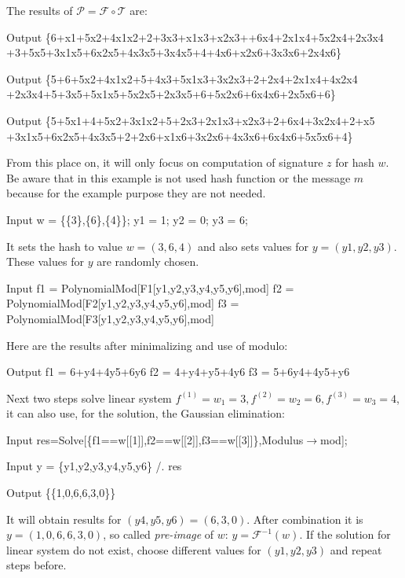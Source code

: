 \documentclass[thesis=M,english]{FITthesis}[2019/12/23]
\begin{document}
\noindent
The results of $\mathcal{P} = \mathcal{F} \circ \mathcal{T}$ are:
\begin{mmaCell}[addtoindex=3,leftmargin=1em]{Output}
\{6+x1+5x2+4x1x2+2+3x3+x1x3+x2x3++6x4+2x1x4+5x2x4+2x3x4
+3+5x5+3x1x5+6x2x5+4x3x5+3x4x5+4+4x6+x2x6+3x3x6+2x4x6\}
\end{mmaCell}
\begin{mmaCell}[leftmargin=1em]{Output}
\{5+6+5x2+4x1x2+5+4x3+5x1x3+3x2x3+2+2x4+2x1x4+4x2x4
+2x3x4+5+3x5+5x1x5+5x2x5+2x3x5+6+5x2x6+6x4x6+2x5x6+6\}
\end{mmaCell}
\begin{mmaCell}[leftmargin=1em]{Output}
\{5+5x1+4+5x2+3x1x2+5+2x3+2x1x3+x2x3+2+6x4+3x2x4+2+x5
+3x1x5+6x2x5+4x3x5+2+2x6+x1x6+3x2x6+4x3x6+6x4x6+5x5x6+4\}
\end{mmaCell}
From this place on, it will only focus on computation of signature $z$ for hash $w$. Be aware that in this example is not used hash function or the message $m$ because for the example purpose they are not needed.
\begin{mmaCell}[moredefined={w, y1, y2, y3}]{Input}
  w  = \{\{3\},\{6\},\{4\}\};
  y1 = 1;
  y2 = 0;
  y3 = 6;
\end{mmaCell}
It sets the hash to value $w = (3,6,4)$ and also sets values for $y = (y1,y2,y3)$. These values for $y$ are randomly chosen.
\begin{mmaCell}[addtoindex=3,moredefined={f1, F1, y1, y2, y3, mod, f2, F2, f3, F3}]{Input}
  f1 = PolynomialMod[F1[y1,y2,y3,y4,y5,y6],mod]
  f2 = PolynomialMod[F2[y1,y2,y3,y4,y5,y6],mod]
  f3 = PolynomialMod[F3[y1,y2,y3,y4,y5,y6],mod]
\end{mmaCell}
Here are the results after minimalizing and use of modulo:
\begin{mmaCell}{Output}
  f1 = 6+y4+4y5+6y6
  f2 = 4+y4+y5+4y6
  f3 = 5+6y4+4y5+y6
\end{mmaCell}
Next two steps solve linear system $f^{(1)} = w_1 = 3, f^{(2)} = w_2 = 6, f^{(3)} = w_3 = 4$, it can also use, for the solution, the Gaussian elimination:
\begin{mmaCell}[moredefined={res, f1, w, f2, f3, mod}]{Input}
  res=Solve[\{f1==w[[1]],f2==w[[2]],f3==w[[3]]\},Modulus\(\pmb{\to}\)mod];
\end{mmaCell}
\begin{mmaCell}[moredefined={y, y1, y2, y3, res}]{Input}
  y = \{y1,y2,y3,y4,y5,y6\} /. res 
\end{mmaCell}
\begin{mmaCell}{Output}
  \{\{1,0,6,6,3,0\}\}
\end{mmaCell}
It will obtain results for $(y4,y5,y6) = (6,3,0)$. After combination it is $y = (1,0,6,6,3,0)$, so called \textit{pre-image} of $w$: $y =  \mathcal{F}^{-1}(w)$. If the solution for linear system do not exist, choose different values for $(y1,y2,y3)$ and repeat steps before.
\end{document}
